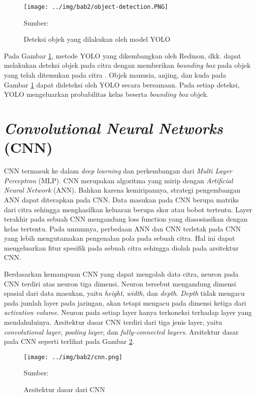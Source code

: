 \begin{figure}[H]
    \begin{center}
        \texttt{[image: ../img/bab2/object-detection.PNG]}
        \caption{Deteksi objek yang dilakukan oleh model YOLO}
        \label{fig:obj-det}
        Sumber: \citep{Redmon2016a}
    \end{center}
\end{figure}

Pada Gambar \ref{fig:obj-det}, metode YOLO yang dikembangkan oleh Redmon, dkk. dapat melakukan deteksi objek pada citra dengan memberikan \textit{bounding box} pada objek yang telah ditemukan pada citra \citep{Redmon2016a}. Objek manusia, anjing, dan kuda pada Gambar \ref{fig:obj-det} dapat dideteksi oleh YOLO secara bersamaan. Pada setiap deteksi, YOLO mengeluarkan probabilitas kelas beserta \textit{bounding box} objek.

\section{\textit{Convolutional Neural Networks} (CNN)}
CNN termasuk ke dalam \textit{deep learning} dan perkembangan dari \textit{Multi Layer Perceptron} (MLP). CNN merupakan algoritma yang mirip dengan \textit{Artificial Neural Network} (ANN). Bahkan karena kemiripannya, strategi pengembangan ANN dapat diterapkan pada CNN. Data masukan pada CNN berupa matriks dari citra sehingga menghasilkan keluaran berupa skor atau bobot tertentu. Layer terakhir pada sebuah CNN mengandung loss function yang diasosiasikan dengan kelas tertentu. Pada umumnya, perbedaan ANN dan CNN terletak pada CNN yang lebih mengutamakan pengenalan pola pada sebuah citra. Hal ini dapat mengeluarkan fitur spesifik pada sebuah citra sehingga diolah pada arsitektur CNN.

Berdasarkan kemampuan CNN yang dapat mengolah data citra, neuron pada CNN terdiri atas neuron tiga dimensi. Neuron tersebut mengandung dimensi spasial dari data masukan, yaitu \textit{height}, \textit{width}, dan \textit{depth}. \textit{Depth} tidak mengacu pada jumlah layer pada jaringan, akan tetapi mengacu pada dimensi ketiga dari \textit{activation volume}. Neuron pada setiap layer hanya terkoneksi terhadap layer yang mendahuluinya. Arsitektur dasar CNN terdiri dari tiga jenis layer, yaitu \textit{convolutional layer}, \textit{pooling layer}, dan \textit{fully-connected layers}. Arsitektur dasar pada CNN seperti terlihat pada Gambar \ref{fig:cnn}.

\begin{figure}[H]
    \begin{center}
        \texttt{[image: ../img/bab2/cnn.png]}
        \caption{Arsitektur dasar dari CNN}
        \label{fig:cnn}
        Sumber: \citep{OShea2015}
    \end{center}
\end{figure}

